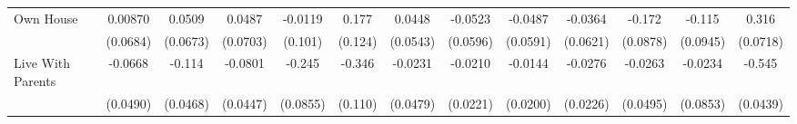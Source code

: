 {\begin{tabular}{l*{12}{c}}
\addlinespace
Own House   &     0.00870         &      0.0509         &      0.0487         &     -0.0119         &       0.177         &      0.0448         &     -0.0523         &     -0.0487         &     -0.0364         &      -0.172         &      -0.115         &       0.316\sym{***}\\
            &    (0.0684)         &    (0.0673)         &    (0.0703)         &     (0.101)         &     (0.124)         &    (0.0543)         &    (0.0596)         &    (0.0591)         &    (0.0621)         &    (0.0878)         &    (0.0945)         &    (0.0718)         \\
\addlinespace
Live With Parents&     -0.0668         &      -0.114\sym{*}  &     -0.0801         &      -0.245\sym{**} &      -0.346\sym{**} &     -0.0231         &     -0.0210         &     -0.0144         &     -0.0276         &     -0.0263         &     -0.0234         &      -0.545\sym{***}\\
            &    (0.0490)         &    (0.0468)         &    (0.0447)         &    (0.0855)         &     (0.110)         &    (0.0479)         &    (0.0221)         &    (0.0200)         &    (0.0226)         &    (0.0495)         &    (0.0853)         &    (0.0439)         \\
\bottomrule
\end{tabular}
}
